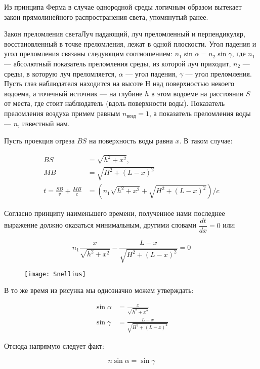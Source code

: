 Из принципа Ферма в случае однородной среды логичным образом вытекает закон прямолинейного распространения света, упомянутый ранее.



\begin{theor}{Закон преломления света}{Луч падающий, луч преломленный и перпендикуляр, восстановленный в точке преломления, лежат в одной плоскости. Угол падения и угол преломления связаны следующим соотношением: $n_{1} \sin \alpha = n_{2} \sin \gamma$, где $n_1$ --- абсолютный показатель преломления среды, из которой луч приходит, $n_2$ --- среды, в которую луч преломляется, $\alpha$ --- угол падения, $\gamma$ --- угол преломления.}
	Пусть глаз наблюдателя находится на высоте H над поверхностью некоего водоема, а точечный источник --- на глубине $h$ в этом водоеме на расстоянии $S$ от места, где стоит наблюдатель (вдоль поверхности воды). Показатель преломления воздуха примем равным $n_{\text{возд}} = 1$, а показатель преломления воды --- $n$, известный нам.
	
	Пусть проекция отреза $BS$ на поверхность воды равна $x$. В таком случае:
	
	\begin{align*}
	BS&=\sqrt{h^{2}+x^{2}},\\
	MB&=\sqrt{H^{2}+(L-x)^{2}} \\ 
	t=\frac{SB}{v}+\frac{MB}{c}&=\left(n_{1}\sqrt{h^{2}+x^{2}}+\sqrt{H^{2}+(L-x)^{2}}\right) / c
	\end{align*}
	
	Согласно принципу наименьшего времени, полученное нами последнее выражение должно оказаться минимальным, другими словами $\dfrac{dt}{dx} = 0$ или:
	
	\begin{equation*}
	n_{1} \frac{x}{\sqrt{h^{2}+x^{2}}}-\frac{L-x}{\sqrt{H^{2}+(L-x)^{2}}}=0
	\end{equation*}
	
	\begin{figure}[H]
		\centering
		\texttt{[image: Snellius]}
	\end{figure}
	
	В то же время из рисунка мы однозначно можем утверждать:
	
	\begin{align*}
	\sin \alpha &= \frac{x}{\sqrt{h^{2}+x^{2}}}\\
	\sin \gamma &= \frac{L-x}{\sqrt{H^{2}+(L-x)^{2}}}
	\end{align*}
	
	
	
	Отсюда напрямую следует факт:
	
	\begin{equation*}
	\boxed{n\sin\alpha = \sin\gamma}
	\end{equation*}
	
\end{theor}